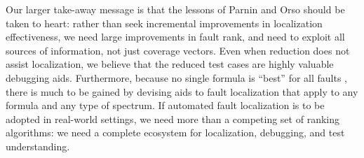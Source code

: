 Our larger take-away message is that the lessons of Parnin and Orso
\cite{AutoHelp} should be taken to heart: rather than seek incremental
improvements in localization effectiveness, we need large improvements
in fault rank, and need to exploit all sources of information, not
just coverage vectors.  Even when reduction does not assist
localization, we believe that the reduced test cases are highly
valuable debugging aids.  Furthermore, because no single formula is
``best'' for all faults \cite{yoo2014no}, there is much to be gained
by devising aids to fault localization that apply to any formula and
any type of spectrum.  If automated fault localization is to be
adopted in real-world settings, we need more than a competing set of
ranking algorithms: we need a complete ecosystem for localization, debugging,
and test understanding.
